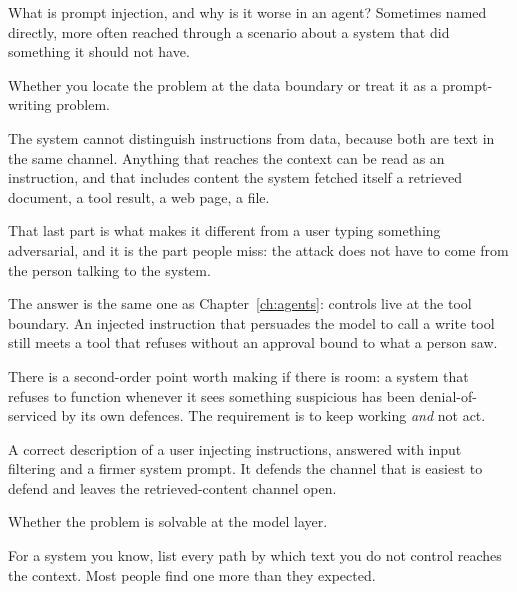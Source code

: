\begin{bankq}{What is prompt injection, and why is it worse in an agent?}
\qasked
Sometimes named directly, more often reached through a scenario about a
system that did something it should not have.

\qtested
Whether you locate the problem at the data boundary or treat it as a
prompt-writing problem.

\qstaff
The system cannot distinguish instructions from data, because both are text in
the same channel. Anything that reaches the context can be read as an
instruction, and that includes content the system fetched itself \dash{} a
retrieved document, a tool result, a web page, a file.

That last part is what makes it different from a user typing something
adversarial, and it is the part people miss: the attack does not have to come
from the person talking to the system. 

The answer is the same one as Chapter~\ref{ch:agents}: controls live at the
tool boundary. An injected instruction that persuades the model to call a write
tool still meets a tool that refuses without an approval bound to what a person
saw. 

There is a second-order point worth making if there is room: a system that
refuses to function whenever it sees something suspicious has been
denial-of-serviced by its own defences. The requirement is to keep working
\emph{and} not act.

\qsenior
A correct description of a user injecting instructions, answered with input
filtering and a firmer system prompt. It defends the channel that is easiest to
defend and leaves the retrieved-content channel open.

\qcontested
Whether the problem is solvable at the model layer. 

\qdrill
For a system you know, list every path by which text you do not control reaches
the context. Most people find one more than they expected.
\end{bankq}

